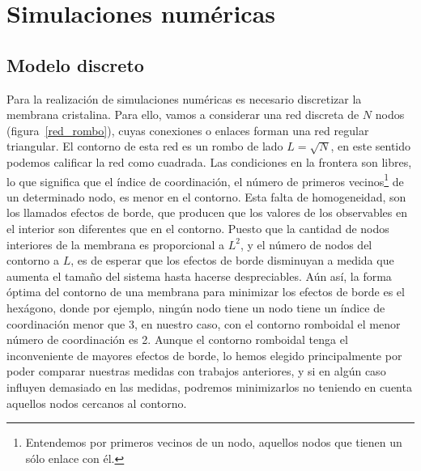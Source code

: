 \chapter{Simulaciones numéricas}

\section{Modelo discreto}

Para la realización de simulaciones numéricas es necesario discretizar la
membrana cristalina. Para ello, vamos a considerar una red 
discreta de $N$ nodos (figura~\ref{red_rombo}), cuyas conexiones o enlaces
forman una red regular triangular. El contorno de esta red es un rombo de lado
$L=\sqrt{N}$, en este sentido podemos calificar la red como cuadrada. 
Las condiciones en la frontera son libres, lo que significa que el índice de
coordinación, el número de primeros vecinos\footnote{Entendemos por primeros
  vecinos de un nodo, aquellos nodos que tienen un sólo enlace con él.} de un
determinado nodo, es menor en el contorno. Esta falta de homogeneidad,
son los llamados efectos de borde, que producen que los valores 
de los observables en el interior son diferentes que en el contorno. Puesto
que la cantidad de nodos interiores de la membrana es proporcional a $L^2$, y
el número de nodos del contorno a $L$, es de esperar que los efectos de borde
disminuyan a medida que aumenta el tamaño del sistema hasta hacerse
despreciables. Aún así, la forma óptima del contorno de una
membrana para minimizar los efectos de borde es el hexágono, donde por
ejemplo, ningún nodo tiene un nodo tiene un índice de coordinación menor que
3, en nuestro caso, con el contorno romboidal el menor número de coordinación
es 2. Aunque el contorno romboidal tenga el inconveniente de mayores efectos
de borde, lo hemos elegido principalmente por poder comparar nuestras medidas
con trabajos anteriores, y si en algún caso influyen
demasiado en las medidas, podremos minimizarlos no teniendo en cuenta
aquellos nodos cercanos al contorno.

